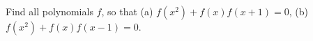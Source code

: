 Find all polynomials $f$, so that (a) $f(x^2) + f(x)f(x + 1) = 0$, (b) $f(x^2) + f(x)f(x - 1) = 0$.
